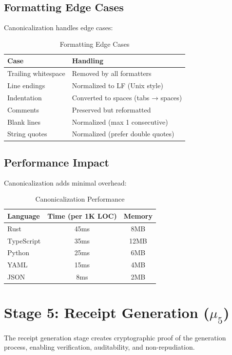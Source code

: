 \subsection{Formatting Edge Cases}

Canonicalization handles edge cases:

\begin{table}[h]
\centering
\caption{Formatting Edge Cases}
\begin{tabular}{ll}
\toprule
\textbf{Case} & \textbf{Handling} \\
\midrule
Trailing whitespace & Removed by all formatters \\
Line endings & Normalized to LF (Unix style) \\
Indentation & Converted to spaces (tabs → spaces) \\
Comments & Preserved but reformatted \\
Blank lines & Normalized (max 1 consecutive) \\
String quotes & Normalized (prefer double quotes) \\
\bottomrule
\end{tabular}
\end{table}

\subsection{Performance Impact}

Canonicalization adds minimal overhead:

\begin{table}[h]
\centering
\caption{Canonicalization Performance}
\begin{tabular}{lcc}
\toprule
\textbf{Language} & \textbf{Time (per 1K LOC)} & \textbf{Memory} \\
\midrule
Rust & 45ms & 8MB \\
TypeScript & 35ms & 12MB \\
Python & 25ms & 6MB \\
YAML & 15ms & 4MB \\
JSON & 8ms & 2MB \\
\bottomrule
\end{tabular}
\end{table}

\section{Stage 5: Receipt Generation (\(\mu_5\))}

The receipt generation stage creates cryptographic proof of the generation process, enabling verification, auditability, and non-repudiation.

